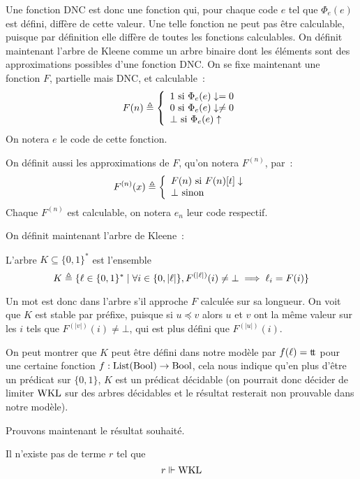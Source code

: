 \documentclass{article}
\begin{document}
Une fonction DNC est donc une fonction qui, pour chaque code $e$ tel que $\Phi_e(e)$ est défini, diffère de cette valeur. Une telle fonction ne peut pas être calculable, puisque par définition elle diffère de toutes les fonctions calculables. On définit maintenant l'arbre de Kleene comme un arbre binaire dont les éléments sont des approximations possibles d'une fonction DNC. On se fixe maintenant une fonction $F$, partielle mais DNC, et calculable~:
\[F(n)\triangleq \left\{\begin{array}{l}
    1\text{ si } \Phi_e(e) \downarrow= 0\\
    0\text{ si } \Phi_e(e) \downarrow \neq 0\\
    \bot\text{ si } \Phi_e(e) \uparrow
\end{array}\right.\]
On notera $e$ le code de cette fonction.

On définit aussi les approximations de $F$, qu'on notera $F^{(n)}$, par~:
\[F^{(n)}(x) \triangleq \left\{\begin{array}{l}
    F(n) \text{ si } F(n)[t]\downarrow\\
    \bot\text{ sinon}
\end{array}\right.\]
Chaque $F^{(n)}$ est calculable, on notera $e_n$ leur code respectif.

On définit maintenant l'arbre de Kleene~:

\begin{defi}
    L'arbre $K\subseteq \{0,1\}^*$ est l'ensemble
    \[K \triangleq \{\ell \in \{0,1\}^* \mid \forall i \in \{0,|\ell|\}, F^{(|\ell|)}(i) \neq \bot \implies \ell_i = F(i)\}\]
\end{defi}

Un mot est donc dans l'arbre s'il approche $F$ calculée sur sa longueur. On voit que $K$ est stable par préfixe, puisque si $u\preceq v$ alors $u$ et $v$ ont la même valeur sur les $i$ tels que $F^{(|v|)}(i)\neq \bot$, qui est plus défini que $F^{(|u|)}(i)$.

On peut montrer que $K$ peut être défini dans notre modèle par $f(\ell) = \mathrm{t}\!\mathrm{t}$ pour une certaine fonction $f : \mathrm{List}(\mathrm{Bool}) \to \mathrm{Bool}$, cela nous indique qu'en plus d'être un prédicat sur $\{0,1\}$, $K$ est un prédicat décidable (on pourrait donc décider de limiter $\mathrm{WKL}$ sur des arbres décidables et le résultat resterait non prouvable dans notre modèle).

Prouvons maintenant le résultat souhaité.

\begin{them}
    Il n'existe pas de terme $r$ tel que
    \[r\Vdash \mathrm{WKL}\]
\end{them}
\end{document}
